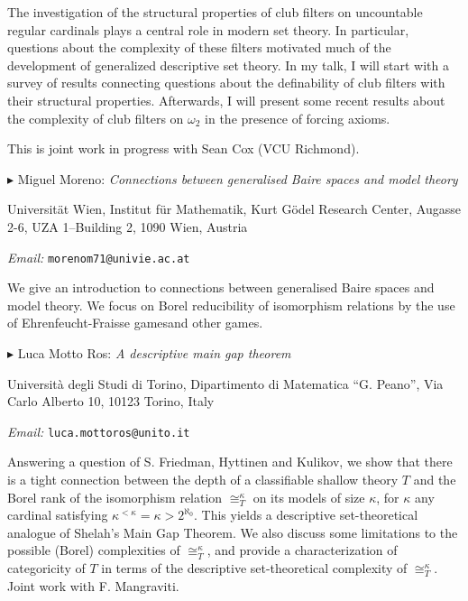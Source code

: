 \documentclass[a4paper]{amsart}
\theoremstyle{remark}
\newcommand{\vsp}{\vspace{20pt}}
\begin{document}
The investigation of the structural properties of club filters on uncountable regular cardinals plays a central role in modern set theory.    
In particular, questions about the complexity of these filters motivated much of the development of generalized descriptive set theory. In my talk, I will start with a survey of results connecting questions about the definability of club filters with their  structural properties. Afterwards, I will present some recent results about the complexity of club filters on $\omega_2$ in the presence of forcing axioms. 

This is joint work in progress with Sean Cox (VCU Richmond). 








\vsp 

\noindent 
$\blacktriangleright$ Miguel Moreno: \emph{Connections between generalised Baire spaces and model theory} 

\noindent 
Universit\"at Wien, Institut f\"ur Mathematik, 
Kurt G\"odel Research Center, 
Augasse 2-6, UZA 1--Building 2, 
1090 Wien, Austria 

\noindent 
\emph{Email:} \texttt{morenom71@univie.ac.at}

We give an introduction to connections between generalised Baire spaces and model theory. We focus on Borel reducibility of isomorphism relations by the use of Ehrenfeucht-Fraisse gamesand other games. 










\vsp 

\noindent 
$\blacktriangleright$ Luca Motto Ros: \emph{A descriptive main gap theorem} 

\noindent 
Universit\`a degli Studi di Torino, Dipartimento di Matematica ``G. Peano'', Via Carlo Alberto 10, 10123 Torino, Italy

\noindent 
\emph{Email:} \texttt{luca.mottoros@unito.it}

Answering a question of S. Friedman, Hyttinen and Kulikov, we show that there is a tight connection between the depth of a classifiable shallow theory $T$ and the Borel rank of the isomorphism relation $\cong^\kappa_T$ on its models of size $\kappa$, for $\kappa$ any cardinal satisfying $\kappa^{< \kappa} = \kappa > 2^{\aleph_0}$. This yields a descriptive set-theoretical analogue of Shelah’s Main Gap Theorem. We also discuss some limitations to the possible (Borel) complexities of $\cong^\kappa_T$, and provide a characterization of categoricity of $T$ in terms of the descriptive set-theoretical complexity of $\cong^\kappa_T$. Joint work with F. Mangraviti.
\end{document}
